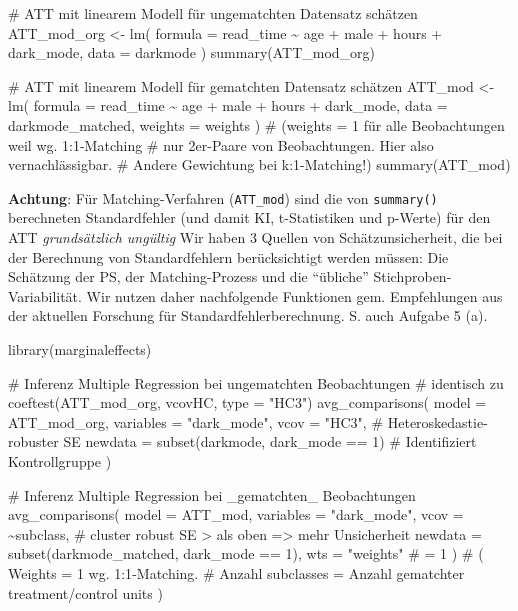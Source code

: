 \documentclass[
  a4paper,
  DIV=11,
  oneside]{scrreprt}
\newenvironment{Shaded}{\begin{snugshade}}{\end{snugshade}}
\newcommand{\NormalTok}[1]{\textcolor[rgb]{0.00,0.23,0.31}{#1}}
\begin{document}
\begin{Shaded}
\begin{Highlighting}[]
\NormalTok{\# ATT mit linearem Modell für ungematchten Datensatz schätzen}
\NormalTok{ATT\_mod\_org \textless{}{-} lm(}
\NormalTok{  formula = read\_time \textasciitilde{} age + male + hours + dark\_mode,}
\NormalTok{  data = darkmode}
\NormalTok{)}
\NormalTok{summary(ATT\_mod\_org)}

\NormalTok{\# ATT mit linearem Modell für gematchten Datensatz schätzen}
\NormalTok{ATT\_mod \textless{}{-} lm(}
\NormalTok{  formula = read\_time \textasciitilde{} age + male + hours + dark\_mode,}
\NormalTok{  data = darkmode\_matched, }
\NormalTok{  weights = weights }
\NormalTok{)}
\NormalTok{\# (weights = 1 für alle Beobachtungen weil wg. 1:1{-}Matching}
\NormalTok{\# nur 2er{-}Paare von Beobachtungen. Hier also vernachlässigbar.}
\NormalTok{\# Andere Gewichtung bei k:1{-}Matching!)}
\NormalTok{summary(ATT\_mod)}
\end{Highlighting}
\end{Shaded}

\textbf{Achtung}: Für Matching-Verfahren (\texttt{ATT\_mod}) sind die
von \texttt{summary()} berechneten Standardfehler (und damit KI,
t-Statistiken und p-Werte) für den ATT \emph{grundsätzlich ungültig} Wir
haben 3 Quellen von Schätzunsicherheit, die bei der Berechnung von
Standardfehlern berücksichtigt werden müssen: Die Schätzung der PS, der
Matching-Prozess und die ``übliche'' Stichproben-Variabilität. Wir
nutzen daher nachfolgende Funktionen gem. Empfehlungen aus der aktuellen
Forschung für Standardfehlerberechnung. S. auch Aufgabe 5 (a).

\begin{Shaded}
\begin{Highlighting}[]
\NormalTok{library(marginaleffects)}

\NormalTok{\# Inferenz Multiple Regression bei ungematchten Beobachtungen}
\NormalTok{\# identisch zu \textquotesingle{}coeftest(ATT\_mod\_org, vcovHC, type = "HC3")\textquotesingle{}}
\NormalTok{avg\_comparisons(}
\NormalTok{  model = ATT\_mod\_org,}
\NormalTok{  variables = "dark\_mode",}
\NormalTok{  vcov = "HC3", \# Heteroskedastie{-}robuster SE}
\NormalTok{  newdata = subset(darkmode, dark\_mode == 1) \# Identifiziert Kontrollgruppe}
\NormalTok{) }

\NormalTok{\# Inferenz Multiple Regression bei \_gematchten\_ Beobachtungen}
\NormalTok{avg\_comparisons(}
\NormalTok{  model = ATT\_mod,}
\NormalTok{  variables = "dark\_mode",}
\NormalTok{  vcov = \textasciitilde{}subclass, \# cluster robust SE \textgreater{} als oben =\textgreater{} mehr Unsicherheit}
\NormalTok{  newdata = subset(darkmode\_matched, dark\_mode == 1),}
\NormalTok{  wts = "weights"  \# = 1}
\NormalTok{)}
\NormalTok{\# ( Weights = 1 wg. 1:1{-}Matching.}
\NormalTok{\# Anzahl subclasses = Anzahl gematchter treatment/control units )}
\end{Highlighting}
\end{Shaded}
\end{document}

